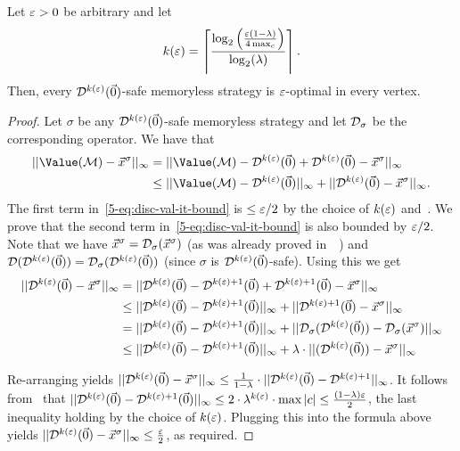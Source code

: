 \begin{lemma}
\label{5-lem:disc-val-it-eps-strategies}
Let $\varepsilon>0$ be arbitrary and let 
$$k(\varepsilon)=\left\lceil\frac{\log_2\left(\frac{\varepsilon(1-\lambda)}{4\max_{c}}\right)}{\log_2(\lambda)}
 \right\rceil .$$ Then, every 
$\mathcal{D}^{k(\varepsilon)}(\vec{0})$-safe memoryless strategy is $\varepsilon$-optimal in 
every vertex.
\end{lemma}
\begin{proof}
Let $\sigma$ be any $\mathcal{D}^{k(\varepsilon)}(\vec{0})$-safe memoryless strategy and 
let $\mathcal{D}_{\sigma}$ be the corresponding operator. We have that
\begin{align}
||\Value(\mdp) - \valsigma ||_{\infty} &= ||\Value(\mdp) 
-\discOP^{k(\eps)}(\vec{0}) +\discOP^{k(\eps)}(\vec{0}) - \valsigma 
||_{\infty} \nonumber
\\
&\leq ||\Value(\mdp) -\discOP^{k(\eps)}(\vec{0}) 
||_{\infty} + || \discOP^{k(\eps)}(\vec{0}) - \valsigma
||_{\infty}. \label{5-eq:disc-val-it-bound}
\end{align}
\noindent
The first term in~\eqref{5-eq:disc-val-it-bound} is $\leq \varepsilon/2$ 
by the choice of $k(\varepsilon)$ and~. We prove 
that the second term 
in~\eqref{5-eq:disc-val-it-bound} is also bounded by $\varepsilon/2$. Note that we 
have $\vec{x}^{\sigma}=\mathcal{D}_{\sigma}(\vec{x}^{\sigma})$ (as was already proved 
in~~) and $\mathcal{D}(\mathcal{D}^{k(\varepsilon)}(\vec{0})) = 
\mathcal{D}_\sigma(\mathcal{D}^{k(\varepsilon)}(\vec{0}))$ (since $\sigma$ is 
$\mathcal{D}^{k(\varepsilon)}(\vec{0})$-safe). Using this we get
\begin{align*}
|| \mathcal{D}^{k(\varepsilon)}(\vec{0}) - \vec{x}^{\sigma}
||_{\infty} & = || \mathcal{D}^{k(\varepsilon)}(\vec{0}) -\mathcal{D}^{k(\varepsilon)+1}(\vec{0}) + 
\mathcal{D}^{k(\varepsilon)+1}(\vec{0}) - \vec{x}^{\sigma}
||_{\infty}\\
&\leq || \mathcal{D}^{k(\varepsilon)}(\vec{0}) -\mathcal{D}^{k(\varepsilon)+1}(\vec{0}) ||_{\infty} + 
||\mathcal{D}^{k(\varepsilon)+1}(\vec{0}) - \vec{x}^{\sigma}
||_{\infty}
\\
&=|| \mathcal{D}^{k(\varepsilon)}(\vec{0}) -\mathcal{D}^{k(\varepsilon)+1}(\vec{0}) ||_{\infty} + 
||\mathcal{D}_\sigma(\mathcal{D}^{k(\varepsilon)}(\vec{0})) - 
\mathcal{D}_\sigma(\vec{x}^{\sigma})||_{\infty}\\
&\leq || \mathcal{D}^{k(\varepsilon)}(\vec{0}) -\mathcal{D}^{k(\varepsilon)+1}(\vec{0}) ||_{\infty} + 
\lambda\cdot||(\mathcal{D}^{k(\varepsilon)}(\vec{0})) - 
\vec{x}^{\sigma}||_{\infty}
\end{align*}

\noindent
Re-arranging yields $|| \mathcal{D}^{k(\varepsilon)}(\vec{0}) - \vec{x}^{\sigma}
||_{\infty} \leq \frac{1}{1-\lambda}\cdot|| 
\mathcal{D}^{k(\varepsilon)}(\vec{0}) - 
\mathcal{D}^{k(\varepsilon)+1}
||_{\infty} $.
It follows from~  that 
$||\mathcal{D}^{k(\varepsilon)}(\vec{0}) -\mathcal{D}^{k(\varepsilon)+1}(\vec{0}) ||_{\infty} 
\leq 2\cdot\lambda^{k(\varepsilon)}\cdot \max|c|\leq 
\frac{(1-\lambda)\varepsilon}{2}$, the last 
inequality holding by the choice of $k(\varepsilon)$. Plugging this into the 
formula above yields $|| \mathcal{D}^{k(\varepsilon)}(\vec{0}) - \vec{x}^{\sigma}
||_{\infty} \leq\frac{\varepsilon}{2}$, as required. 
%
\end{proof}


